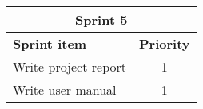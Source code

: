 \label{sprint5}
\begin{center}
	\begin{Large}
	\begin{tabular}{|p{10.5cm}|c|}
		\hline
		\multicolumn{2}{|c|}{\textbf{Sprint 5}} \\
		\hline
		\large{\textbf{Sprint item}} & \large{\textbf{Priority}} \\
		\hline
		\large{Write project report} & \large{1} \\
		\hline
		\large{Write user manual} & \large{1} \\
		\hline
	\end{tabular}
	\end{Large}
\end{center}